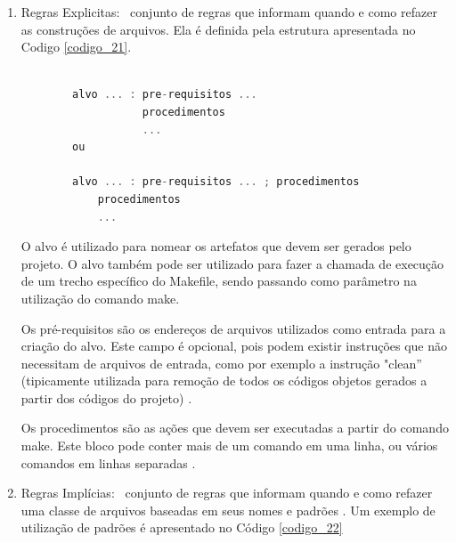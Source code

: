 \begin{enumerate}

    \item Regras Explicitas: \
        conjunto de regras que informam quando e como refazer as construções
         de arquivos. Ela é definida pela estrutura apresentada no Codigo \ref{codigo_21}.


        \begin{lstlisting}[language=C++,frame=single,title={Código 21: 
                                     Chamada de Sistema para executar o programa make },
                                                        label=codigo_21]

        alvo ... : pre-requisitos ... 
                   procedimentos
                   ...
        ou 

        alvo ... : pre-requisitos ... ; procedimentos
            procedimentos
            ...

        \end{lstlisting}


 O alvo é utilizado para nomear os artefatos que devem ser gerados pelo projeto.
 O alvo também pode ser utilizado para fazer a chamada de execução de um trecho
 específico do Makefile,  sendo passando como parâmetro na utilização do comando
 make.


 Os pré-requisitos são os endereços de arquivos utilizados como entrada para a 
criação do alvo. Este campo é opcional, pois podem existir instruções que não
 necessitam de arquivos de entrada, como por exemplo a instrução "clean”
 (tipicamente utilizada para remoção de todos os códigos objetos gerados a partir
 dos códigos do projeto) \cite{ref47}.

Os procedimentos são as ações que devem ser executadas a partir do comando make.
Este bloco pode conter mais de um comando em uma linha, ou  vários comandos em
 linhas separadas \cite{ref47}.

    \item Regras Implícias: \
 conjunto de regras que informam quando e como refazer uma classe de arquivos
 baseadas em seus nomes e padrões \cite{ref48}. Um exemplo de utilização de 
 padrões é apresentado no Código \ref{codigo_22} \cite{ref49}
        
    \begin{lstlisting}[language=C++,frame=single,title={Código 22: 
                      Exemplo de utilização de padrões no makefile},
                                                    label=codigo_22]


\end{lstlisting}
\end{enumerate}
